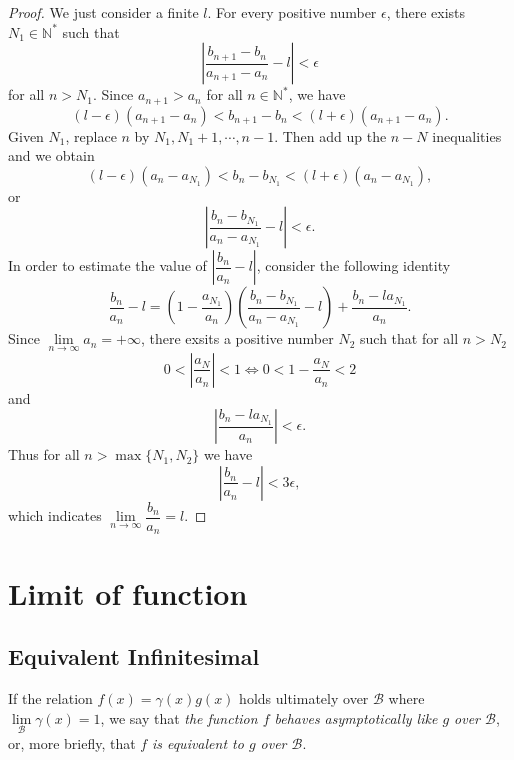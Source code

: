 \documentclass[11pt,fleqn]{book} %
\begin{document}
\begin{proof}
	We just consider a finite $l$. For every positive number $\epsilon$, there exists $N_1\in\mathbb{N^*}$ such that
	\[
	\left|\frac{b_{n+1}-b_n}{a_{n+1}-a_n}-l\right|<\epsilon
	\]
	for all $n>N_1$. Since $a_{n+1}>a_n$ for all $n\in\mathbb{N^*}$, we have
	\[
	(l-\epsilon)(a_{n+1}-a_{n})<b_{n+1}-b_{n}<(l+\epsilon)(a_{n+1}-a_{n}).
	\]
	Given $N_1$, replace $n$ by $N_1,N_1+1,\cdots,n-1$. Then add up the $n-N$ inequalities and we obtain
	\[
	(l-\epsilon)(a_n-a_{N_1})<b_n-b_{N_1}<(l+\epsilon)(a_n-a_{N_1}),
	\]
	or
	\[
	\left|\frac{b_n-b_{N_1}}{a_n-a_{N_1}}-l\right|<\epsilon.
	\]
	In order to estimate the value of $\left|\dfrac{b_n}{a_n}-l\right|$, consider the following identity
	\[
	\frac{b_n}{a_n}-l=\left(1-\frac{a_{N_1}}{a_n}\right)\left(\frac{b_n-b_{N_1}}{a_n-a_{N_1}}-l\right)+\frac{b_n-la_{N_1}}{a_n}.
	\]
	Since $\lim\limits_{n\to\infty}a_n=+\infty$, there exsits a positive number $N_2$ such that for all $n>N_2$
	\[
	0<\left|\frac{a_N}{a_n}\right|<1\Leftrightarrow0<1-\frac{a_N}{a_n}<2
	\]
	and
	\[
	\left|\frac{b_n-la_{N_1}}{a_n}\right|<\epsilon.
	\]
	Thus for all $n>\max\{N_1,N_2\}$ we have
	\[
	\left|\dfrac{b_n}{a_n}-l\right|<3\epsilon,
	\]
	which indicates $\lim\limits_{n\to\infty}\dfrac{b_n}{a_n}=l$.

\end{proof}









\chapter{Limit of function}

\section{Equivalent Infinitesimal}

\begin{definition}
If the relation $f(x)=\gamma(x)g(x)$ holds ultimately over $\mathcal{B}$ where $\lim\limits_{\mathcal{B}}{\gamma(x)}=1$, we say that \emph{the function $f$ behaves asymptotically like $g$ over $\mathcal{B}$}, or, more briefly, that $f$ \emph{is equivalent to $g$ over $\mathcal{B}$}.



\end{definition}
\end{document}

